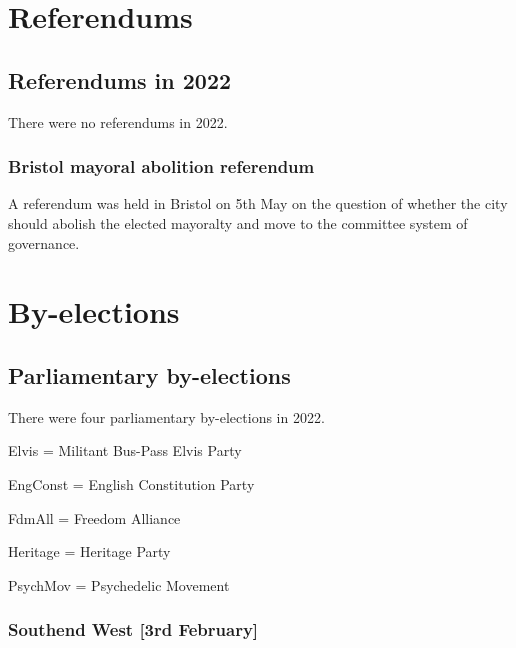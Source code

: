 \documentclass[a4paper,openany]{book}
\begin{document}



\part{Referendums}

\chapter{Referendums in 2022}

There were no referendums in 2022.

\section{Bristol mayoral abolition referendum}

A referendum was held in Bristol on 5th May on the question of whether the city should abolish the elected mayoralty and move to the committee system of governance.


\part{By-elections}

\chapter{Parliamentary by-elections}

There were four parliamentary by-elections in 2022.

%
%
Elvis = Militant Bus-Pass Elvis Party

EngConst = English Constitution Party

FdmAll = Freedom Alliance

Heritage = Heritage Party

PsychMov = Psychedelic Movement
%
%
%
%

\section*{Southend West \hspace*{\fill}\nolinebreak[1]%
	\enspace\hspace*{\fill}
	[3rd February]}
\end{document}
